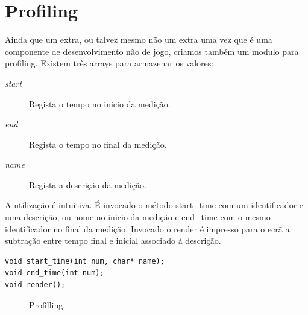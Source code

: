 \chapter{Profiling}
Ainda que um extra, ou talvez mesmo não um extra uma vez que é uma componente de desenvolvimento não de jogo, criamos também um modulo para profiling. Existem três arrays para armazenar os valores:

\begin{description}
\item[\textit{start}] Regista o tempo no inicio da medição.
\item[\textit{end}] Regista o tempo no final da medição.
\item[\textit{name}] Regista a descrição da medição.
\end{description}

A utilização é intuitiva. É invocado o método start\_time com um identificador e uma descrição, ou nome no inicio da medição e end\_time com o mesmo identificador no final da medição. Invocado o render é impresso para o ecrã a subtração entre tempo final e inicial associado à descrição.

\begin{lstlisting}[caption=Métodos para trabalhar com profiling.]
void start_time(int num, char* name);
void end_time(int num);
void render();
\end{lstlisting}

\begin{figure}[here]
                 \caption{Profilling.}
                 \label{fig:prototype}
\end{figure}